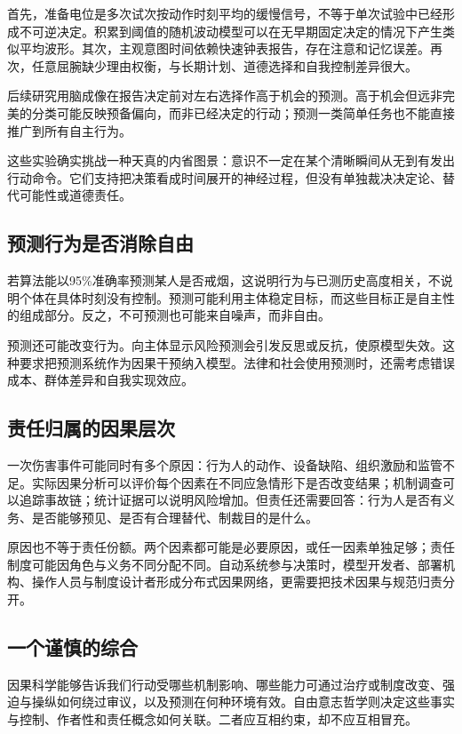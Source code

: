 首先，准备电位是多次试次按动作时刻平均的缓慢信号，不等于单次试验中已经形成不可逆决定。积累到阈值的随机波动模型可以在无早期固定决定的情况下产生类似平均波形\parencite{schurger2012}。其次，主观意图时间依赖快速钟表报告，存在注意和记忆误差。再次，任意屈腕缺少理由权衡，与长期计划、道德选择和自我控制差异很大。

后续研究用脑成像在报告决定前对左右选择作高于机会的预测\parencite{soon2008}。高于机会但远非完美的分类可能反映预备偏向，而非已经决定的行动；预测一类简单任务也不能直接推广到所有自主行为。

这些实验确实挑战一种天真的内省图景：意识不一定在某个清晰瞬间从无到有发出行动命令。它们支持把决策看成时间展开的神经过程，但没有单独裁决决定论、替代可能性或道德责任。

\subsection{预测行为是否消除自由}

若算法能以95\%准确率预测某人是否戒烟，这说明行为与已测历史高度相关，不说明个体在具体时刻没有控制。预测可能利用主体稳定目标，而这些目标正是自主性的组成部分。反之，不可预测也可能来自噪声，而非自由。

预测还可能改变行为。向主体显示风险预测会引发反思或反抗，使原模型失效。这种要求把预测系统作为因果干预纳入模型。法律和社会使用预测时，还需考虑错误成本、群体差异和自我实现效应。

\subsection{责任归属的因果层次}

一次伤害事件可能同时有多个原因：行为人的动作、设备缺陷、组织激励和监管不足。实际因果分析可以评价每个因素在不同应急情形下是否改变结果；机制调查可以追踪事故链；统计证据可以说明风险增加。但责任还需要回答：行为人是否有义务、是否能够预见、是否有合理替代、制裁目的是什么。

原因也不等于责任份额。两个因素都可能是必要原因，或任一因素单独足够；责任制度可能因角色与义务不同分配不同。自动系统参与决策时，模型开发者、部署机构、操作人员与制度设计者形成分布式因果网络，更需要把技术因果与规范归责分开。

\subsection{一个谨慎的综合}

因果科学能够告诉我们行动受哪些机制影响、哪些能力可通过治疗或制度改变、强迫与操纵如何绕过审议，以及预测在何种环境有效。自由意志哲学则决定这些事实与控制、作者性和责任概念如何关联。二者应互相约束，却不应互相冒充。

